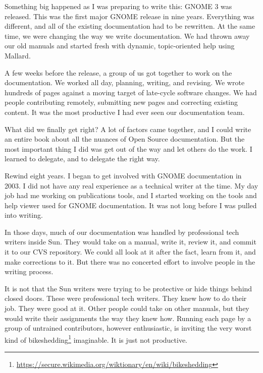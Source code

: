 

Something big happened as I was preparing to write this: GNOME 3 was released.
This was the first major GNOME release in nine years. Everything was different,
and all of the existing documentation had to be rewritten. At the same time, we
were changing the way we write documentation. We had thrown away our old manuals
and started fresh with dynamic, topic-oriented help using Mallard.

A few weeks before the release, a group of us got together to work on the
documentation. We worked all day, planning, writing, and revising. We wrote
hundreds of pages against a moving target of late-cycle software changes. We
had people contributing remotely, submitting new pages and correcting existing
content. It was the most productive I had ever seen our documentation team.

What did we finally get right? A lot of factors came together, and I could
write an entire book about all the nuances of Open Source documentation.
But the most important thing I did was get out of the way and let others
do the work. I learned to delegate, and to delegate the right way.

Rewind eight years. I began to get involved with GNOME documentation in 2003.
I did not have any real experience as a technical writer at the time. My day
job had me working on publications tools, and I started working on the tools
and help viewer used for GNOME documentation. It was not long before I was
pulled into writing.

In those days, much of our documentation was handled by professional tech
writers inside Sun. They would take on a manual, write it, review it, and
commit it to our CVS repository. We could all look at it after the fact,
learn from it, and make corrections to it. But there was no concerted
effort to involve people in the writing process.

It is not that the Sun writers were trying to be protective or hide things
behind closed doors. These were professional tech writers. They knew how
to do their job. They were good at it. Other people could take on other
manuals, but they would write their assignments the way they knew how.
Running each page by a group of untrained contributors, however
enthusiastic, is inviting the very worst kind of bikeshedding\footnote{\url{https://secure.wikimedia.org/wiktionary/en/wiki/bikeshedding}}
imaginable. It is just not productive.

